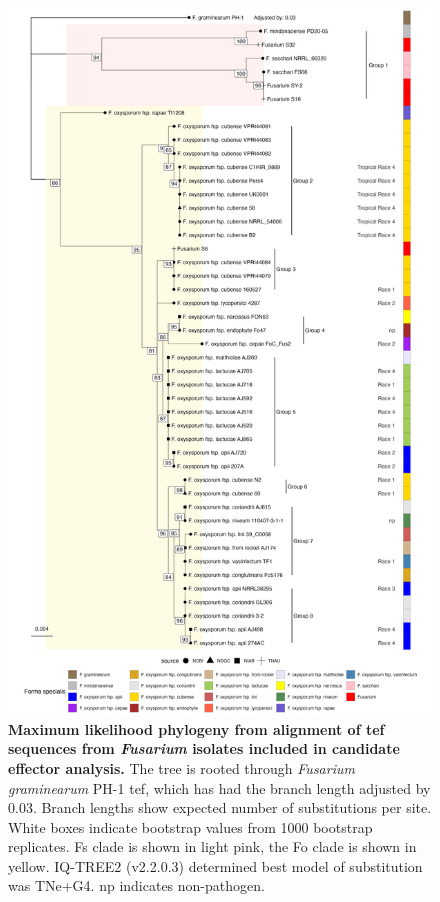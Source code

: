 \begin{figure}[hp!]
    \centering
    \includegraphics[width=12cm]{Figures/BasicTEFPhylo.png}
    \captionsetup{width=\textwidth}
    \caption[Maximum likelihood phylogeny from alignment of \Acl{tef} sequences from \textit{Fusarium} isolates included in candidate effector analysis.]{\textbf{Maximum likelihood phylogeny from alignment of \Acf{tef} sequences from \textit{Fusarium} isolates included in candidate effector analysis.} The tree is rooted through \textit{Fusarium graminearum} PH-1 \ac{tef}, which has had the branch length adjusted by 0.03. Branch lengths show expected number of substitutions per site. White boxes indicate bootstrap values from 1000 bootstrap replicates. \acl{Fs} clade is shown in light pink, the \ac{Fo} clade is shown in yellow. IQ-TREE2 (v2.2.0.3) determined best model of substitution was TNe+G4. np indicates non-pathogen.}
    \label{fig:TEF1aPhyloaMaei}
\end{figure}

